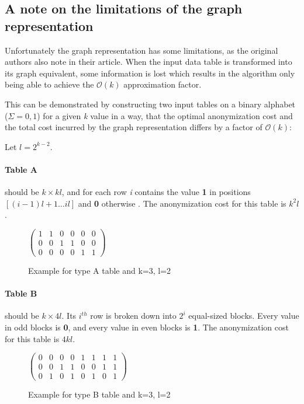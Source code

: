 \subsection{A note on the limitations of the graph representation}

Unfortunately the graph representation has some limitations, as the original authors also note in their article. \cite{aggarwal} When the input data table is transformed into its graph equivalent, some information is lost which results in the algorithm only being able to achieve the \(\mathcal{O}(k)\) approximation factor.

This can be demonstrated by constructing two input tables on a binary alphabet (\(\Sigma={0,1}\)) for a given \textit{k} value in a way, that the optimal anonymization cost and the total cost incurred by the graph representation differs by a factor of \(\mathcal{O}(k)\):

Let \(l=2^{k-2}\).

\paragraph{Table A} should be \(k \times kl\), and for each row \textit{i} contains the value \textbf{1} in positions \([(i-1)l+1 \dots il]\) and \textbf{0} otherwise . The anonymization cost for this table is \(k^2l\).

\vspace{\baselineskip}
\begin{figure}[H]
	\centering
	\(
	\begin{pmatrix}
		1 & 1 & 0 & 0 & 0 & 0 \\
		0 & 0 & 1 & 1 & 0 & 0 \\
		0 & 0 & 0 & 0 & 1 & 1
	\end{pmatrix}
	\)
	\caption{Example for type A table and k=3, l=2}
	\label{fig:graph_limit_A}
\end{figure}



\paragraph{Table B} should be \(k \times 4l\). Its \(i^{th}\) row is broken down into \(2^i\) equal-sized blocks. Every value in odd blocks is \textbf{0}, and every value in even blocks is \textbf{1}. The anonymization cost for this table is \(4kl\).

\vspace{\baselineskip}
\begin{figure}[H]
	\centering
	\(
	\begin{pmatrix}
		0 & 0 & 0 & 0 & 1 & 1 & 1 & 1 \\
		0 & 0 & 1 & 1 & 0 & 0 & 1 & 1 \\
		0 & 1 & 0 & 1 & 0 & 1 & 0 & 1
	\end{pmatrix}
	\)
	\caption{Example for type B table and k=3, l=2}
	\label{fig:graph_limit_B}
\end{figure}

